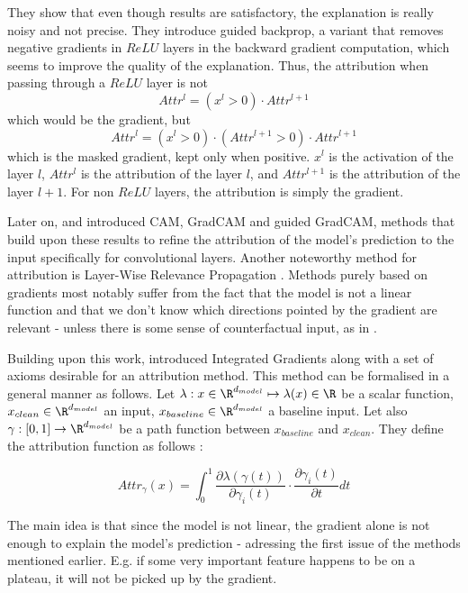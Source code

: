 \documentclass{article}
\begin{document}
They show that even though results are satisfactory, the explanation is really noisy and not precise. They introduce guided backprop, a variant that removes negative gradients in $ReLU$ layers in the backward gradient computation, which seems to improve the quality of the explanation.
Thus, the attribution when passing through a $ReLU$ layer is not
$$ Attr^l = (x^l > 0) \cdot Attr^{l+1} $$
which would be the gradient, but
$$ Attr^l = (x^l > 0) \cdot (Attr^{l+1} > 0) \cdot Attr^{l+1} $$
which is the masked gradient, kept only when positive. $x^l$ is the activation of the layer $l$, $Attr^l$ is the attribution of the layer $l$, and $Attr^{l+1}$ is the attribution of the layer $l+1$. For non $ReLU$ layers, the attribution is simply the gradient.

Later on, \citet{zhou2016CAM} and \citet{selvaraju2017GradCAM} introduced CAM, GradCAM and guided GradCAM, methods that build upon these results to refine the attribution of the model's prediction to the input specifically for convolutional layers. Another noteworthy method for attribution is Layer-Wise Relevance Propagation \citep{montavon2019layerLRP}. Methods purely based on gradients most notably suffer from the fact that the model is not a linear function and that we don't know which directions pointed by the gradient are relevant - unless there is some sense of counterfactual input, as in \citep{syed2023attributionAtP}.

Building upon this work, \citet{sundararajan2017axiomaticIG} introduced Integrated Gradients along with a set of axioms desirable for an attribution method. This method can be formalised in a general manner as follows. Let $\lambda : x \in \R^{d_{model}} \mapsto \lambda(x) \in \R$ be a scalar function, $x_{clean} \in \R^{d_{model}}$ an input, $x_{baseline} \in \R^{d_{model}}$ a baseline input. Let also $\gamma : [0, 1] \rightarrow \R^{d_{model}}$ be a path function between $x_{baseline}$ and $x_{clean}$. They define the attribution function as follows :

$$ Attr_{\gamma}(x) = \int_{0}^{1} \frac{\partial \lambda(\gamma(t))}{\partial \gamma_i(t)} \cdot \frac{\partial \gamma_i(t)}{\partial t} dt $$

The main idea is that since the model is not linear, the gradient alone is not enough to explain the model's prediction - adressing the first issue of the methods mentioned earlier. E.g. if some very important feature happens to be on a plateau, it will not be picked up by the gradient.%
    
\end{document}

